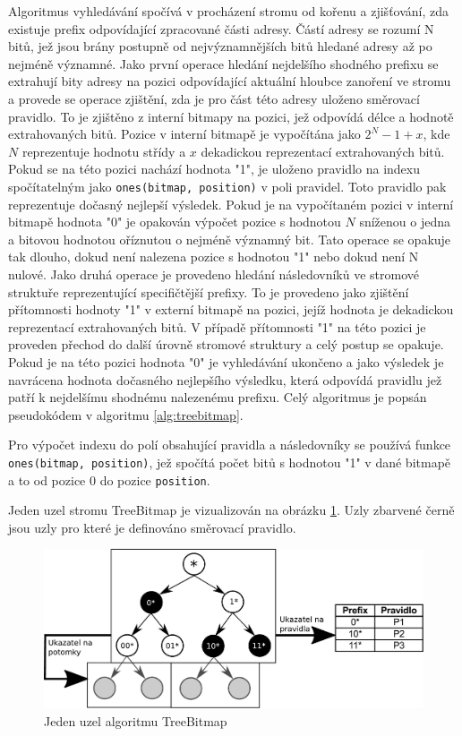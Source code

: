 Algoritmus vyhledávání spočívá v procházení stromu od kořenu a zjišťování, zda
existuje prefix odpovídající zpracované části adresy. Částí adresy se rozumí N bitů, jež jsou brány postupně
od nejvýznamnějších bitů hledané adresy až po nejméně významné.
Jako první operace hledání nejdelšího shodného prefixu se extrahují bity adresy na pozici odpovídající
aktuální hloubce zanoření ve stromu a provede se operace zjištění, zda je pro část této adresy uloženo
směrovací pravidlo. To je zjištěno z interní bitmapy na pozici, jež odpovídá délce a hodnotě extrahovaných bitů.
Pozice v interní bitmapě je vypočítána jako $2^{N} - 1 + x$, kde $N$ reprezentuje hodnotu střídy a $x$
dekadickou reprezentací extrahovaných bitů.
Pokud se na této pozici
nachází hodnota "1", je uloženo pravidlo na indexu spočítatelným jako \texttt{ones(bitmap, position)} v poli pravidel.
Toto pravidlo pak reprezentuje dočasný nejlepší výsledek. Pokud je na vypočítaném
pozici v interní bitmapě hodnota "0" je opakován výpočet pozice s hodnotou $N$ sníženou o jedna a bitovou hodnotou
oříznutou o nejméně významný bit. Tato operace se opakuje tak dlouho, dokud není nalezena pozice
s hodnotou "1"
nebo dokud není N nulové. Jako druhá operace je provedeno hledání následovníků ve stromové struktuře
reprezentující specifičtější prefixy. To je provedeno jako zjištění přítomnosti hodnoty "1" v externí
bitmapě na pozici, jejíž hodnota je dekadickou reprezentací extrahovaných bitů. V případě přítomnosti
"1" na této pozici je proveden přechod do další úrovně stromové struktury a celý postup se opakuje.
Pokud je na této pozici hodnota "0" je vyhledávání ukončeno a jako výsledek je navrácena hodnota
dočasného nejlepšího výsledku, která odpovídá pravidlu jež patří k nejdelšímu shodnému nalezenému
prefixu. Celý algoritmus je popsán pseudokódem v algoritmu \ref{alg:treebitmap}.

Pro výpočet indexu do polí obsahující pravidla a následovníky se používá funkce
\texttt{ones(bitmap, position)}, jež
spočítá počet bitů s hodnotou "1" v dané bitmapě a to od pozice 0 do pozice \texttt{position}.

Jeden uzel stromu TreeBitmap je vizualizován na obrázku \ref{fig:tbm-node}. Uzly zbarvené černě
jsou uzly pro které je definováno směrovací pravidlo.

\begin{figure}[!htbp]
    \centering
    \includegraphics[scale=.55]{fig/tbm.pdf}
    \caption{Jeden uzel algoritmu TreeBitmap}
    \label{fig:tbm-node}
\end{figure}

